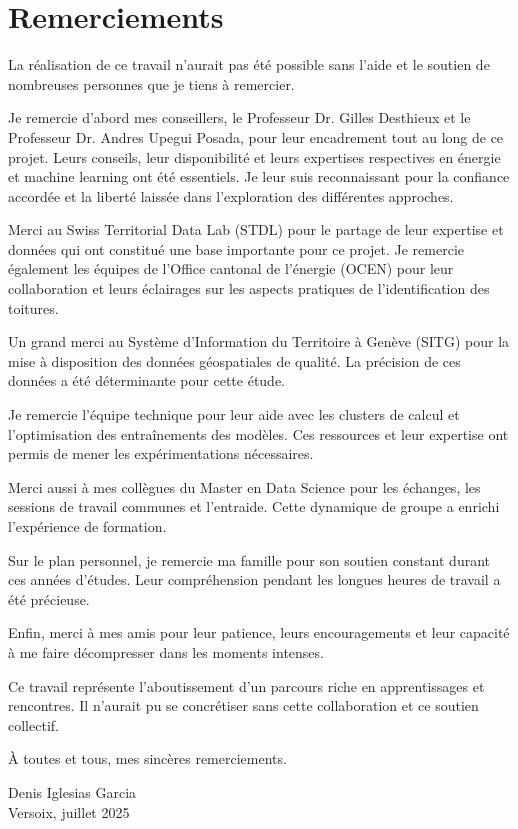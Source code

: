 
\chapter*{Remerciements}

La réalisation de ce travail n'aurait pas été possible sans l'aide et le soutien de nombreuses personnes que je tiens à remercier.

Je remercie d'abord mes conseillers, le Professeur Dr. Gilles Desthieux et le Professeur Dr. Andres Upegui Posada, pour leur encadrement tout au long de ce projet. Leurs conseils, leur disponibilité et leurs expertises respectives en énergie et machine learning ont été essentiels. Je leur suis reconnaissant pour la confiance accordée et la liberté laissée dans l'exploration des différentes approches.

Merci au Swiss Territorial Data Lab (STDL) pour le partage de leur expertise et données qui ont constitué une base importante pour ce projet. Je remercie également les équipes de l'Office cantonal de l'énergie (OCEN) pour leur collaboration et leurs éclairages sur les aspects pratiques de l'identification des toitures.

Un grand merci au Système d'Information du Territoire à Genève (SITG) pour la mise à disposition des données géospatiales de qualité. La précision de ces données a été déterminante pour cette étude.

Je remercie l'équipe technique pour leur aide avec les clusters de calcul et l'optimisation des entraînements des modèles. Ces ressources et leur expertise ont permis de mener les expérimentations nécessaires.

Merci aussi à mes collègues du Master en Data Science pour les échanges, les sessions de travail communes et l'entraide. Cette dynamique de groupe a enrichi l'expérience de formation.

Sur le plan personnel, je remercie ma famille pour son soutien constant durant ces années d'études. Leur compréhension pendant les longues heures de travail a été précieuse.

Enfin, merci à mes amis pour leur patience, leurs encouragements et leur capacité à me faire décompresser dans les moments intenses.

Ce travail représente l'aboutissement d'un parcours riche en apprentissages et rencontres. Il n'aurait pu se concrétiser sans cette collaboration et ce soutien collectif.

À toutes et tous, mes sincères remerciements.
 
\vspace{1cm}

Denis Iglesias Garcia \\
Versoix, juillet 2025
